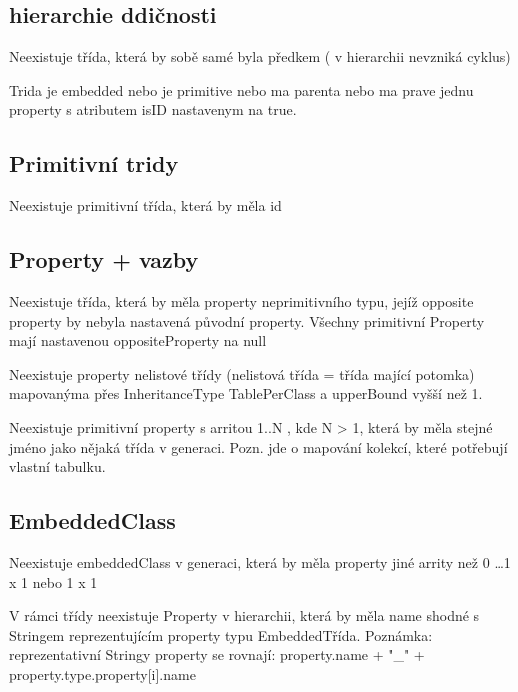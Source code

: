 \documentclass{article}
\begin{document}
\subsection{hierarchie ddičnosti}
Neexistuje třída, která by sobě samé byla předkem ( v hierarchii nevzniká
cyklus)

Trida je embedded nebo je primitive nebo ma parenta nebo ma prave jednu property
s atributem isID nastavenym na true.

\subsection{Primitivní tridy}
Neexistuje primitivní třída, která by měla id

\subsection{Property + vazby}
Neexistuje třída, která by měla property neprimitivního typu, jejíž opposite
property by nebyla nastavená původní property. 
Všechny primitivní Property mají nastavenou oppositeProperty na null 

Neexistuje property nelistové třídy (nelistová třída = třída mající potomka)
mapovanýma přes InheritanceType TablePerClass a upperBound vyšší než 1.

Neexistuje primitivní property s arritou 1..N , kde N > 1, která by měla stejné
jméno jako nějaká třída v generaci. Pozn. jde o mapování kolekcí, které potřebují
vlastní tabulku.


\subsection{EmbeddedClass}
Neexistuje embeddedClass v generaci, která by měla property jiné arrity než
0 \ldots 1 x 1 nebo 1 x 1 \newline

V rámci třídy neexistuje Property v hierarchii, která by měla name shodné s
Stringem reprezentujícím property typu EmbeddedTřída. Poznámka: reprezentativní
Stringy property se rovnají:\newline
 property.name + "\_" + property.type.property[i].name \newline
\end{document}
